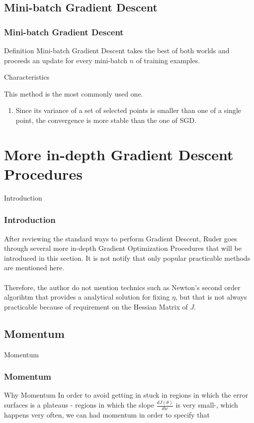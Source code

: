 \documentclass{beamer}
\begin{document}
\subsection{Mini-batch Gradient Descent}
\begin{frame}
\frametitle{Mini-batch Gradient Descent}
\begin{block}{Definition}
Mini-batch Gradient Descent takes the best of both worlds and proceeds an update for every mini-batch $n$ of training examples.
\end{block}

\begin{block}{Characteristics}

This method is the most commonly used one.
\begin{enumerate}
	\item Since its variance of a set of selected points is smaller than one of a single point, the convergence is more stable than the one of SGD.
\end{enumerate}
\end{block}
\end{frame}

\section{More in-depth Gradient Descent Procedures}

\begin{frame}{Introduction}
\frametitle{Introduction}

After reviewing the standard ways to perform Gradient Descent, Ruder goes through several more in-depth Gradient Optimization Procedures that will be introduced in this section. It is not notify that only popular practicable methods are mentioned here.\\~\\
Therefore, the author do not mention technics such as Newton's second order algorihtm that provides a analytical solution for fixing $\eta$, but that is not always practicable because of requirement on the Hessian Matrix of $J$.
\end{frame}


\subsection{Momentum}


\begin{frame}{Momentum}
\frametitle{Momentum}

\begin{block}{Why Momentum}
In order to avoid getting in stuck in regions in which the error surfaces is a plateaus - regions in which the slope $\frac{dJ(\theta)}{dw}$ is very small-, which happens very often, we can had momentum in order to specify that 
\end{block}

\end{frame}
\end{document}
